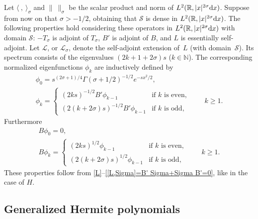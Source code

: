 \documentclass[11pt]{article}
\newcommand{\R}{\mathbb{R}}
\newcommand{\N}{\mathbb{N}}
\newcommand{\LL}{\mathcal{L}}
\renewcommand{\SS}{\mathcal{S}}
\begin{document}
Let $\langle\ ,\ \rangle_\sigma$ and $\|\ \|_\sigma$ be the scalar product and norm of $L^2(\R,|x|^{2\sigma}{\rm d}x)$. Suppose from now on that $\sigma>-1/2$, obtaining that $\SS$ is dense in $L^2(\R,|x|^{2\sigma}{\rm d}x)$. The following properties hold considering these operators in $L^2(\R,|x|^{2\sigma}{\rm d}x)$ with domain $\SS$: $-T_\sigma$ is adjoint of $T_\sigma$, $B'$ is adjoint of $B$, and $L$ is essentially self-adjoint. Let $\LL$, or $\LL_\sigma$, denote the self-adjoint extension of~$L$ (with domain~$\SS$). Its spectrum consists of the eigenvalues $(2k+1+2\sigma)s$ ($k\in\N$). The corresponding normalized eigenfunctions $\phi_k$ are inductively def\/ined by
  \begin{gather}
    \phi_0 =s^{(2\sigma+1)/4}\Gamma(\sigma+1/2)^{-1/2}e^{-sx^2/2} ,\label{phi 0}\\
    \phi_k =
      \begin{cases}
        (2ks)^{-1/2}B'\phi_{k-1} & \text{if $k$ is even},\\
        (2(k+2\sigma)s)^{-1/2}B'\phi_{k-1} & \text{if $k$ is odd},
      \end{cases}
    \qquad k\ge1 .
    \label{phi k}
  \end{gather}
Furthermore
    \begin{gather}
      B\phi_0 =0 ,\label{B phi 0}\\
      B\phi_k =
        \begin{cases}
          (2ks)^{1/2}\phi_{k-1} & \text{if $k$ is even},\\
          (2(k+2\sigma)s)^{1/2}\phi_{k-1} & \text{if $k$ is odd},
        \end{cases}
      \qquad k\ge1 .
      \label{B phi k}
    \end{gather}
These properties follow from \eqref{L}--\eqref{[L,Sigma]=B' Sigma+Sigma B'=0}, like in the case of $H$.



\subsection{Generalized Hermite polynomials}\label{ss:p k}
\end{document}
